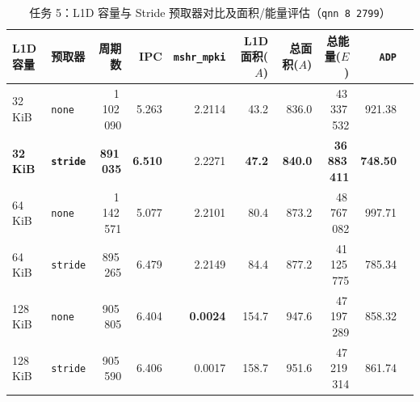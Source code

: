 \documentclass[12pt,a4paper,fontset=mac]{ctexart}
\begin{document}
\begin{table}[H]\centering\footnotesize\setlength{\tabcolsep}{3.8pt}
\caption{任务 5：L1D 容量与 Stride 预取器对比及面积/能量评估（\texttt{qnn 8 2799}）}\label{tab:t5_cmp}
\begin{tabular}{llrrrrrrrr}\toprule
L1D 容量 & 预取器 & 周期数 & IPC & \texttt{mshr\_mpki} & L1D 面积($A$) & 总面积($A$) & 总能量($E$) & \texttt{ADP} \\\midrule
32 KiB  & \texttt{none}   & 1\,102\,090 & 5.263 & 2.2114 & 43.2  & 836.0 & 43\,337\,532 & 921.38 \\
\textbf{32 KiB} & \textbf{\texttt{stride}} & \textbf{891\,035} & \textbf{6.510} & 2.2271 & \textbf{47.2} & \textbf{840.0} & \textbf{36\,883\,411} & \textbf{748.50} \\
64 KiB  & \texttt{none}   & 1\,142\,571 & 5.077 & 2.2101 & 80.4  & 873.2 & 48\,767\,082 & 997.71 \\
64 KiB  & \texttt{stride} & 895\,265    & 6.479 & 2.2149 & 84.4  & 877.2 & 41\,125\,775 & 785.34 \\
128 KiB & \texttt{none}   & 905\,805    & 6.404 & \textbf{0.0024} & 154.7 & 947.6 & 47\,197\,289 & 858.32 \\
128 KiB & \texttt{stride} & 905\,590    & 6.406 & 0.0017 & 158.7 & 951.6 & 47\,219\,314 & 861.74 \\
\bottomrule\end{tabular}
\end{table}
\end{document}

